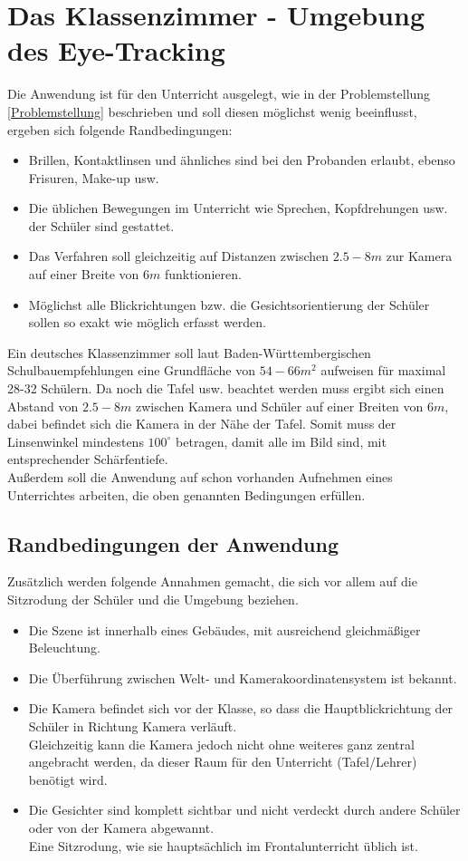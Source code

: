 \section{Das Klassenzimmer - Umgebung des Eye-Tracking}
Die Anwendung ist für den Unterricht ausgelegt, wie in der Problemstellung \autoref{Problemstellung} beschrieben und soll diesen möglichst wenig beeinflusst, ergeben sich folgende Randbedingungen:
\begin{itemize}
\item Brillen, Kontaktlinsen und ähnliches sind bei den Probanden erlaubt, ebenso Frisuren, Make-up usw.
\item Die üblichen Bewegungen im Unterricht wie Sprechen, Kopfdrehungen usw. der Schüler sind gestattet.
\item Das Verfahren soll gleichzeitig auf Distanzen zwischen $2.5 - 8m$ zur Kamera auf einer Breite von $6m$ funktionieren.
\item Möglichst alle Blickrichtungen bzw. die Gesichtsorientierung der Schüler sollen so exakt wie möglich erfasst werden.
\end{itemize}
Ein deutsches Klassenzimmer soll laut Baden-Württembergischen Schulbauempfehlungen eine Grundfläche von $54-66m^2$ aufweisen für maximal 28-32 Schülern. Da noch die Tafel usw. beachtet werden muss ergibt sich einen Abstand von $2.5 - 8m$ zwischen Kamera und Schüler auf einer Breiten von $6m$, dabei befindet sich die Kamera in der Nähe der Tafel. Somit muss der Linsenwinkel mindestens $100^\circ$ betragen, damit alle im Bild sind, mit entsprechender Schärfentiefe.\\
Außerdem soll die Anwendung auf schon vorhanden Aufnehmen eines Unterrichtes arbeiten, die oben genannten Bedingungen erfüllen.\\
\cite{bauordung}
\subsection{Randbedingungen der Anwendung}
Zusätzlich werden folgende Annahmen gemacht, die sich vor allem auf die Sitzrodung der Schüler und die Umgebung beziehen.
\begin{itemize}
\item Die Szene ist innerhalb eines Gebäudes, mit ausreichend gleichmäßiger Beleuchtung.
\item Die Überführung zwischen Welt- und Kamerakoordinatensystem ist bekannt.
\item Die Kamera befindet sich vor der Klasse, so dass die Hauptblickrichtung der Schüler in Richtung Kamera verläuft.\\
Gleichzeitig kann die Kamera jedoch nicht ohne weiteres ganz zentral angebracht werden, da dieser Raum für den Unterricht (Tafel/Lehrer) benötigt wird.
\item Die Gesichter sind komplett sichtbar und nicht verdeckt durch andere Schüler oder von der Kamera abgewannt.\\
Eine Sitzrodung, wie sie hauptsächlich im Frontalunterricht üblich ist.
\end{itemize}
